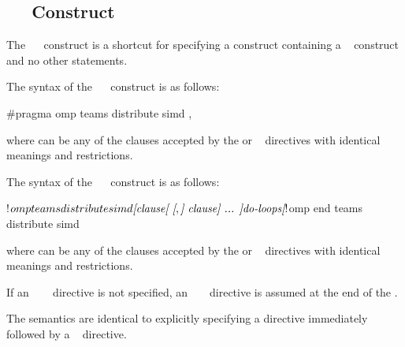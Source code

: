 \subsection{~~ Construct}
\label{subsec:teams distribute simd Construct}
\summary
The ~~ construct is a shortcut for 
specifying a  construct containing a ~ 
construct and no other statements.

\syntax
\begin{ccppspecific}
The syntax of the ~~ construct is as follows:

\begin{ompcPragma}
#pragma omp teams distribute simd \plc{[clause[ [},\plc{] clause] ... ] new-line}
\end{ompcPragma}

where  can be any of the clauses accepted by the  or 
~ directives with identical meanings and restrictions.
\end{ccppspecific}

\begin{fortranspecific}
The syntax of the ~~ construct is as follows:

\begin{ompfPragma}
!$omp teams distribute simd \plc{[clause[ [},\plc{] clause] ... ]}
    \plc{do-loops}
\plc{[}!$omp end teams distribute simd\plc{]}
\end{ompfPragma}

where  can be any of the clauses accepted by the  or 
~ directives with identical meanings and restrictions.

If an ~~~ directive is
not specified, an ~ ~
directive is assumed at the end of the .
\end{fortranspecific}

\descr
The semantics are identical to explicitly specifying a  directive 
immediately followed by a ~ directive.


